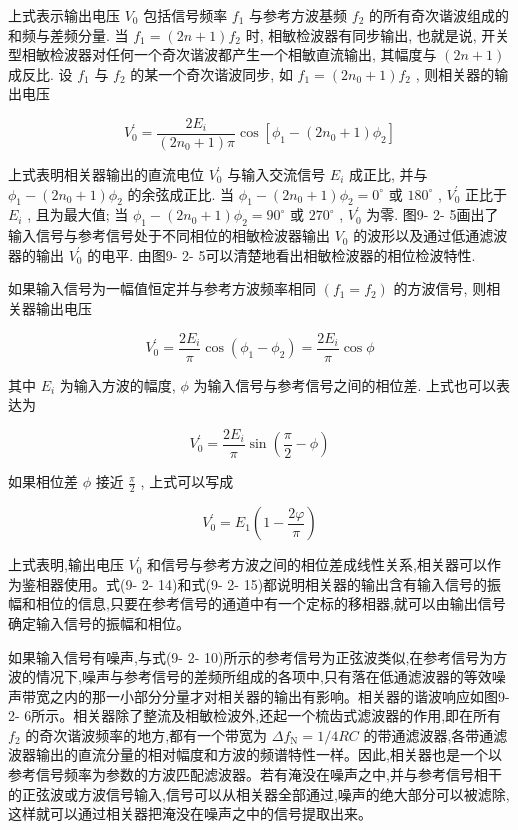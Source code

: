 \documentclass[12pt,a4paper]{article}
\begin{document}
上式表示输出电压 \(V_{0}\) 包括信号频率 \(f_{1}\) 与参考方波基频 \(f_{2}\) 的所有奇次谐波组成的和频与差频分量. 当 \(f_{1} = (2n + 1)f_{2}\) 时, 相敏检波器有同步输出, 也就是说, 开关型相敏检波器对任何一个奇次谐波都产生一个相敏直流输出, 其幅度与 \((2n + 1)\) 成反比. 设 \(f_{1}\) 与 \(f_{2}\) 的某一个奇次谐波同步, 如 \(f_{1} = (2n_{0} + 1)f_{2}\) , 则相关器的输出电压

\[
V_{0}^{\prime} = \frac{2E_{i}}{(2n_{0} + 1)\pi}\cos \left[\phi_{1} - (2n_{0} + 1)\phi_{2}\right] \tag{9-2-14}
\]

上式表明相关器输出的直流电位 \(V_{0}^{\prime}\) 与输入交流信号 \(E_{i}\) 成正比, 并与 \(\phi_{1} - (2n_{0} + 1)\phi_{2}\) 的余弦成正比. 当 \(\phi_{1} - (2n_{0} + 1)\phi_{2} = 0^{\circ}\) 或 \(180^{\circ}\) , \(V_{0}^{\prime}\) 正比于 \(E_{i}\) , 且为最大值; 当 \(\phi_{1} - (2n_{0} + 1)\phi_{2} = 90^{\circ}\) 或 \(270^{\circ}\) , \(V_{0}^{\prime}\) 为零. 图9- 2- 5画出了输入信号与参考信号处于不同相位的相敏检波器输出 \(V_{0}\) 的波形以及通过低通滤波器的输出 \(V_{0}^{\prime}\) 的电平. 由图9- 2- 5可以清楚地看出相敏检波器的相位检波特性.

如果输入信号为一幅值恒定并与参考方波频率相同 \((f_{1} = f_{2})\) 的方波信号, 则相关器输出电压

\[
V_{0}^{\prime} = \frac{2E_{i}}{\pi}\cos (\phi_{1} - \phi_{2}) = \frac{2E_{i}}{\pi}\cos \phi
\]

其中 \(E_{i}\) 为输入方波的幅度, \(\phi\) 为输入信号与参考信号之间的相位差. 上式也可以表达为

\[
V_{0}^{\prime} = \frac{2E_{i}}{\pi}\sin \left(\frac{\pi}{2} -\phi\right)
\]

如果相位差 \(\phi\) 接近 \(\frac{\pi}{2}\) , 上式可以写成

\[
V_{0}^{\prime} = E_{1}\left(1 - \frac{2\varphi}{\pi}\right) \tag{9-2-15}
\]

上式表明,输出电压 \(V_{0}^{\prime}\) 和信号与参考方波之间的相位差成线性关系,相关器可以作为鉴相器使用。式(9- 2- 14)和式(9- 2- 15)都说明相关器的输出含有输入信号的振幅和相位的信息,只要在参考信号的通道中有一个定标的移相器,就可以由输出信号确定输入信号的振幅和相位。

如果输入信号有噪声,与式(9- 2- 10)所示的参考信号为正弦波类似,在参考信号为方波的情况下,噪声与参考信号的差频所组成的各项中,只有落在低通滤波器的等效噪声带宽之内的那一小部分分量才对相关器的输出有影响。相关器的谐波响应如图9- 2- 6所示。相关器除了整流及相敏检波外,还起一个梳齿式滤波器的作用,即在所有 \(f_{2}\) 的奇次谐波频率的地方,都有一个带宽为 \(\Delta f_{\mathrm{N}} = 1 / 4RC\) 的带通滤波器,各带通滤波器输出的直流分量的相对幅度和方波的频谱特性一样。因此,相关器也是一个以参考信号频率为参数的方波匹配滤波器。若有淹没在噪声之中,并与参考信号相干的正弦波或方波信号输入,信号可以从相关器全部通过,噪声的绝大部分可以被滤除,这样就可以通过相关器把淹没在噪声之中的信号提取出来。
\end{document}
